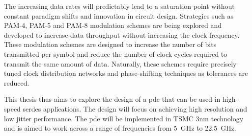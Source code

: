 The increasing data rates will predictably lead to a saturation point without constant paradigm shifts and innovation in circuit design. Strategies such as PAM-4, PAM-5 and PAM-8 modulation schemes are being explored and developed to increase data throughput without increasing the clock frequency. These modulation schemes are designed to increase the number of bits transmitted per symbol and reduce the number of clock cycles required to transmit the same amount of data. Naturally, these schemes require precisely tuned clock distribution networks and phase-shifting techniques as tolerances are reduced.

This thesis thus aims to explore the design of a \gls{pde} that can be used in high-speed \gls{serdes} applications. The design will focus on achieving high resolution and low jitter performance. The \gls{pde} will be implemented in TSMC 3nm technology and is aimed to work across a range of frequencies from 5~GHz to 22.5~GHz.

